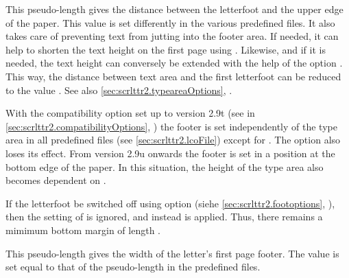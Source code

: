 \begin{Declaration}
\end{Declaration}
%
%
This pseudo-length gives the distance between the letterfoot and the
upper edge of the paper. This value is set differently in the various
predefined  files. It also takes care of preventing text
from jutting into the footer area. If needed, it can help to shorten
the text height on the first page using .
Likewise, and if it is needed, the text height can conversely be
extended with the help of the option . This
way, the distance between text area and the first letterfoot can be
reduced to the value . See also
\autoref{sec:scrlttr2.typeareaOptions},
.

With the compatibility option set up
to version 2.9t (see  in
\autoref{sec:scrlttr2.compatibilityOptions},
) the footer is set
independently of the type area in all predefined  files (see
\autoref{sec:scrlttr2.lcoFile}) except for . The
option  also loses its effect. From version
2.9u onwards the footer is set in a position at the bottom edge of the
paper. In this situation, the height of the type area also becomes
dependent on .

If the letterfoot be switched off using option
(siehe \autoref{sec:scrlttr2.footoptions},
), then the setting of
 is ignored, and instead
 is applied.  Thus, there
remains a mimimum bottom margin of length
.
%
%


\begin{Declaration}
\end{Declaration}
%
This pseudo-length gives the width of the letter's first page
footer. The value is set equal to that of the pseudo-length
 in the predefined  files.
%
%


